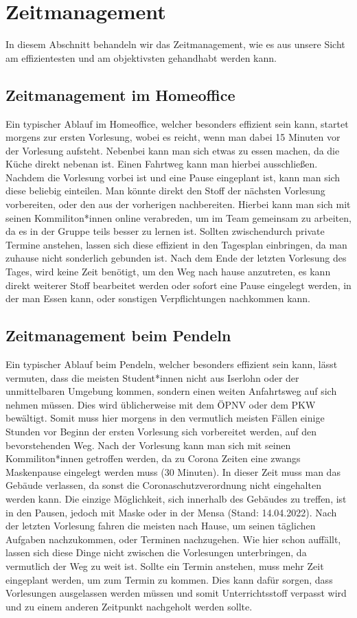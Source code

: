 \documentclass[a4paper,12pt]{scrartcl}
\begin{document}
\section{Zeitmanagement}
In diesem Abschnitt behandeln wir das Zeitmanagement, wie es aus unsere Sicht am effizientesten und am objektivsten gehandhabt werden kann.

\subsection{Zeitmanagement im Homeoffice}
Ein typischer Ablauf im Homeoffice, welcher besonders effizient sein kann, startet morgens zur ersten Vorlesung, wobei es reicht, wenn man dabei 15 Minuten vor der Vorlesung aufsteht. Nebenbei kann man sich etwas zu essen machen, da die Küche direkt nebenan ist. Einen Fahrtweg kann man hierbei ausschließen. Nachdem die Vorlesung vorbei ist und eine Pause eingeplant ist, kann man sich diese beliebig einteilen. Man könnte direkt den Stoff der nächsten Vorlesung vorbereiten, oder den aus der vorherigen nachbereiten. Hierbei kann man sich mit seinen Kommiliton*innen online verabreden, um im Team gemeinsam zu arbeiten, da es in der Gruppe teils besser zu lernen ist. Sollten zwischendurch private Termine anstehen, lassen sich diese effizient in den Tagesplan einbringen, da man zuhause nicht sonderlich gebunden ist. Nach dem Ende der letzten Vorlesung des Tages, wird keine Zeit benötigt, um den Weg nach hause anzutreten, es kann direkt weiterer Stoff bearbeitet werden oder sofort eine Pause eingelegt werden, in der man Essen kann, oder sonstigen Verpflichtungen nachkommen kann.

\subsection{Zeitmanagement beim Pendeln}
Ein typischer Ablauf beim Pendeln, welcher besonders effizient sein kann, lässt vermuten, dass die meisten Student*innen nicht aus Iserlohn oder der unmittelbaren Umgebung kommen, sondern einen weiten Anfahrtsweg auf sich nehmen müssen. Dies wird üblicherweise mit dem ÖPNV oder dem PKW bewältigt. Somit muss hier morgens in den vermutlich meisten Fällen einige Stunden vor Beginn der ersten Vorlesung sich vorbereitet werden, auf den bevorstehenden Weg. Nach der Vorlesung kann man sich mit seinen Kommiliton*innen getroffen werden, da zu Corona Zeiten eine zwangs Maskenpause eingelegt werden muss (30 Minuten). In dieser Zeit muss man das Gebäude verlassen, da sonst die Coronaschutzverordnung nicht eingehalten werden kann. Die einzige Möglichkeit, sich innerhalb des Gebäudes zu treffen, ist in den Pausen, jedoch mit Maske oder in der Mensa (Stand: 14.04.2022). Nach der letzten Vorlesung fahren die meisten nach Hause, um seinen täglichen Aufgaben nachzukommen, oder Terminen nachzugehen. Wie hier schon auffällt, lassen sich diese Dinge nicht zwischen die Vorlesungen unterbringen, da vermutlich der Weg zu weit ist. Sollte ein Termin anstehen, muss mehr Zeit eingeplant werden, um zum Termin zu kommen. Dies kann dafür sorgen, dass Vorlesungen ausgelassen werden müssen und somit Unterrichtsstoff verpasst wird und zu einem anderen Zeitpunkt nachgeholt werden sollte.
\end{document}
